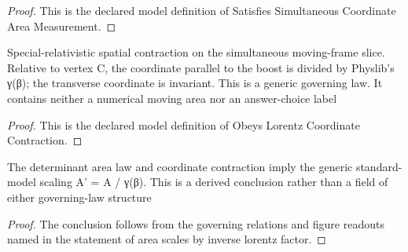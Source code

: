 \begin{proof}
  This is the declared model definition of Satisfies Simultaneous Coordinate Area Measurement.
\end{proof}
\begin{definition}
  \label{def:physics:phyx-mini-0566:phyxminiproblems-problemphyxmini0566-obeyslorentzcoordinatecontraction}
  Special-relativistic spatial contraction on the simultaneous moving-frame slice. Relative to vertex C, the coordinate parallel to the boost is divided by Physlib's γ(β); the transverse coordinate is invariant. This is a generic governing law. It contains neither a numerical moving area nor an answer-choice label
\end{definition}
\begin{proof}
  This is the declared model definition of Obeys Lorentz Coordinate Contraction.
\end{proof}
\begin{lemma}
  \label{lem:physics:phyx-mini-0566:phyxminiproblems-problemphyxmini0566-area-scales-by-inverse-lorentz-factor}
  The determinant area law and coordinate contraction imply the generic standard-model scaling A' = A / γ(β). This is a derived conclusion rather than a field of either governing-law structure
\end{lemma}
\begin{proof}
  The conclusion follows from the governing relations and figure readouts named in the statement of area scales by inverse lorentz factor.
\end{proof}
